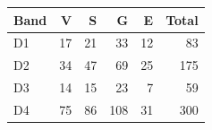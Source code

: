 \begin{tabular}{lrrrrr}
\toprule
Band & V & S & G & E & Total\\\midrule
D1 & 17 & 21 & 33 & 12 & 83\\
D2 & 34 & 47 & 69 & 25 & 175\\
D3 & 14 & 15 & 23 & 7 & 59\\
D4 & 75 & 86 & 108 & 31 & 300\\
\bottomrule
\end{tabular}
